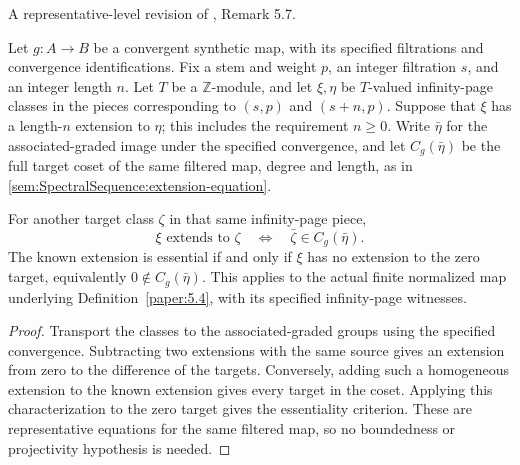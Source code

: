 \begin{remark}
\label{paper:5.7}
\label{def:fErextess}
A representative-level revision of \cite{LWX126}, Remark 5.7.

Let $g:A\to B$ be a convergent synthetic map, with its specified
filtrations and convergence identifications. Fix a stem and weight $p$,
an integer filtration $s$, and an integer length $n$. Let $T$ be a
$\mathbb Z$-module, and let $\xi,\eta$ be $T$-valued infinity-page
classes in the pieces corresponding to $(s,p)$ and $(s+n,p)$.
Suppose that $\xi$ has a length-$n$ extension to $\eta$; this includes
the requirement $n\geq0$. Write $\bar\eta$ for the associated-graded
image under the specified convergence, and let $C_g(\bar\eta)$ be
the full target coset of the same filtered map, degree and length, as in
\ref{sem:SpectralSequence:extension-equation}.

For another target class $\zeta$ in that same infinity-page piece,
\[
\xi\text{ extends to }\zeta
\quad\Longleftrightarrow\quad
\bar\zeta\in C_g(\bar\eta).
\]
The known extension is essential if and only if $\xi$ has no extension
to the zero target, equivalently $0\notin C_g(\bar\eta)$.
This applies to the actual finite normalized map underlying
Definition~\ref{paper:5.4}, with its specified infinity-page witnesses.
\end{remark}
\begin{proof}
Transport the classes to the associated-graded groups using the specified
convergence. Subtracting two extensions with the same source gives an
extension from zero to the difference of the targets. Conversely, adding
such a homogeneous extension to the known extension gives every target
in the coset. Applying this characterization to the zero target gives
the essentiality criterion. These are representative equations for the
same filtered map, so no boundedness or projectivity hypothesis is needed.
\end{proof}

